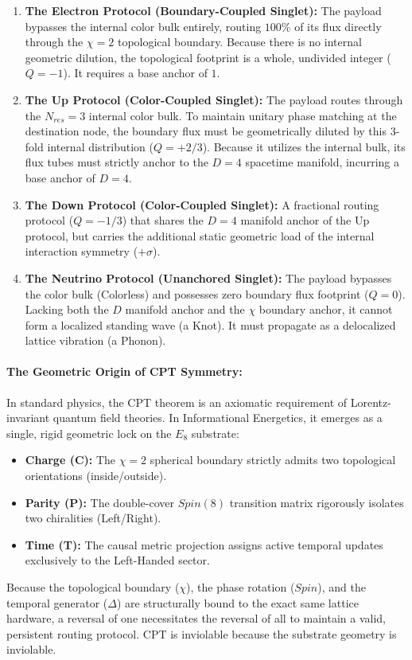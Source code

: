 \begin{enumerate}
    \item \textbf{The Electron Protocol (Boundary-Coupled Singlet):} The payload bypasses the internal color bulk entirely, routing $100\%$ of its flux directly through the $\chi=2$ topological boundary. Because there is no internal geometric dilution, the topological footprint is a whole, undivided integer ($Q=-1$). It requires a base anchor of $1$.
    
    \item \textbf{The Up Protocol (Color-Coupled Singlet):} The payload routes through the $N_{res}=3$ internal color bulk. To maintain unitary phase matching at the destination node, the boundary flux must be geometrically diluted by this 3-fold internal distribution ($Q=+2/3$). Because it utilizes the internal bulk, its flux tubes must strictly anchor to the $D=4$ spacetime manifold, incurring a base anchor of $D=4$.
    
    \item \textbf{The Down Protocol (Color-Coupled Singlet):} A fractional routing protocol ($Q=-1/3$) that shares the $D=4$ manifold anchor of the Up protocol, but carries the additional static geometric load of the internal interaction symmetry ($+\sigma$). 
    
    \item \textbf{The Neutrino Protocol (Unanchored Singlet):} The payload bypasses the color bulk (Colorless) and possesses zero boundary flux footprint ($Q=0$). Lacking both the $D$ manifold anchor and the $\chi$ boundary anchor, it cannot form a localized standing wave (a Knot). It must propagate as a delocalized lattice vibration (a Phonon).
\end{enumerate}

\paragraph{The Geometric Origin of CPT Symmetry:}
In standard physics, the CPT theorem is an axiomatic requirement of Lorentz-invariant quantum field theories. In Informational Energetics, it emerges as a single, rigid geometric lock on the $E_8$ substrate:
\begin{itemize}
    \item \textbf{Charge (C):} The $\chi=2$ spherical boundary strictly admits two topological orientations (inside/outside).
    \item \textbf{Parity (P):} The double-cover $Spin(8)$ transition matrix rigorously isolates two chiralities (Left/Right).
    \item \textbf{Time (T):} The causal metric projection assigns active temporal updates exclusively to the Left-Handed sector.
\end{itemize}
Because the topological boundary ($\chi$), the phase rotation ($Spin$), and the temporal generator ($\Delta$) are structurally bound to the exact same lattice hardware, a reversal of one necessitates the reversal of all to maintain a valid, persistent routing protocol. CPT is inviolable because the substrate geometry is inviolable.

